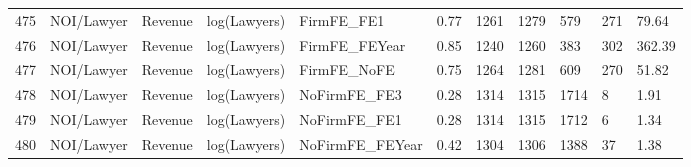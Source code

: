 \begin{table}[ht]
\begin{tabular}{rllllllllll}
  475 & NOI/Lawyer & Revenue & log(Lawyers) & FirmFE\_FE1 & 0.77 & 1261 & 1279 & 579 & 271 & 79.64 \\ 
  476 & NOI/Lawyer & Revenue & log(Lawyers) & FirmFE\_FEYear & 0.85 & 1240 & 1260 & 383 & 302 & 362.39 \\ 
  477 & NOI/Lawyer & Revenue & log(Lawyers) & FirmFE\_NoFE & 0.75 & 1264 & 1281 & 609 & 270 & 51.82 \\ 
  478 & NOI/Lawyer & Revenue & log(Lawyers) & NoFirmFE\_FE3 & 0.28 & 1314 & 1315 & 1714 & 8 & 1.91 \\ 
  479 & NOI/Lawyer & Revenue & log(Lawyers) & NoFirmFE\_FE1 & 0.28 & 1314 & 1315 & 1712 & 6 & 1.34 \\ 
  480 & NOI/Lawyer & Revenue & log(Lawyers) & NoFirmFE\_FEYear & 0.42 & 1304 & 1306 & 1388 & 37 & 1.38 \\ 
   \hline
\end{tabular}
\end{table}
